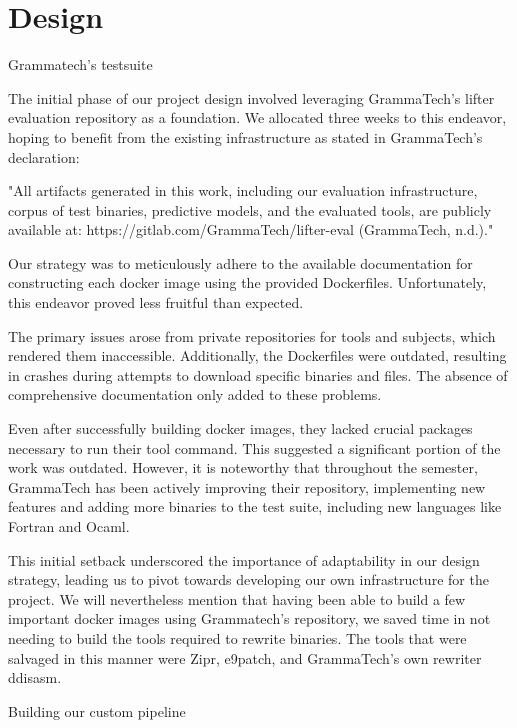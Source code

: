 \documentclass[a4paper,11pt,oneside]{report}
\begin{document}
\chapter{Design}

\setlength{\parindent}{4em}

\indent{}Grammatech’s testsuite

The initial phase of our project design involved leveraging GrammaTech's lifter
evaluation repository as a foundation. We allocated three weeks to this endeavor, hoping to
benefit from the existing infrastructure as stated in GrammaTech's declaration:

"All artifacts generated in this work, including our evaluation infrastructure, corpus
of test binaries, predictive models, and the evaluated tools, are publicly available at:
https://gitlab.com/GrammaTech/lifter-eval (GrammaTech, n.d.)."

Our strategy was to meticulously adhere to the available documentation for
constructing each docker image using the provided Dockerfiles. Unfortunately, this
endeavor proved less fruitful than expected.

The primary issues arose from private repositories for tools and subjects, which
rendered them inaccessible. Additionally, the Dockerfiles were outdated, resulting in
crashes during attempts to download specific binaries and files. The absence of
comprehensive documentation only added to these problems.

Even after successfully building docker images, they lacked crucial packages
necessary to run their tool command. This suggested a significant portion of the work was
outdated. However, it is noteworthy that throughout the semester, GrammaTech has been
actively improving their repository, implementing new features and adding more binaries to
the test suite, including new languages like Fortran and Ocaml.

This initial setback underscored the importance of adaptability in our design
strategy, leading us to pivot towards developing our own infrastructure for the project. We
will nevertheless mention that having been able to build a few important docker images
using Grammatech’s repository, we saved time in not needing to build the tools required to
rewrite binaries. The tools that were salvaged in this manner were Zipr, e9patch, and
GrammaTech’s own rewriter ddisasm.

Building our custom pipeline
\end{document}
